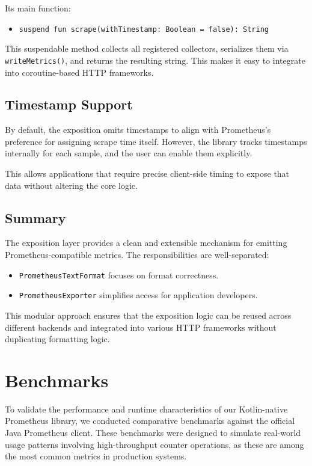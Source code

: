 Its main function:

\begin{itemize}
    \item \texttt{suspend fun scrape(withTimestamp: Boolean = false): String}
\end{itemize}

This suspendable method collects all registered collectors, serializes them via \texttt{writeMetrics()}, and returns the resulting string.
This makes it easy to integrate into coroutine-based HTTP frameworks.

\subsection{Timestamp Support}\label{subsec:timestamp-support}

By default, the exposition omits timestamps to align with Prometheus's preference for assigning scrape time itself.
However, the library tracks timestamps internally for each sample, and the user can enable them explicitly.

This allows applications that require precise client-side timing to expose that data without altering the core logic.

\subsection{Summary}\label{subsec:summary}

The exposition layer provides a clean and extensible mechanism for emitting Prometheus-compatible metrics.
The responsibilities are well-separated:

\begin{itemize}
    \item \texttt{PrometheusTextFormat} focuses on format correctness.
    \item \texttt{PrometheusExporter} simplifies access for application developers.
\end{itemize}

This modular approach ensures that the exposition logic can be reused across different backends and integrated into various HTTP frameworks without duplicating formatting logic.


\section{Benchmarks}

To validate the performance and runtime characteristics of our Kotlin-native Prometheus library, we conducted comparative benchmarks against the official Java Prometheus client. These benchmarks were designed to simulate real-world usage patterns involving high-throughput counter operations, as these are among the most common metrics in production systems.

